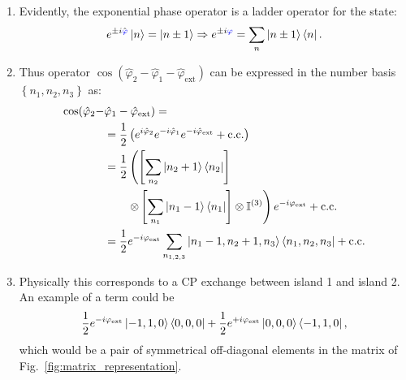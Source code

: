 \begin{enumerate}
\item Evidently, the exponential phase operator is a ladder operator for the  state:
  \begin{equation}
    \label{eq:ab5}
    e^{\pm i\hat{\textcolor{blue}{\varphi}}}\ket{n} = \ket{n \pm 1} \Rightarrow e^{\pm i\textcolor{blue}{\varphi}} = \sum_{{n}} \ket{n\pm1}\bra{n}.
  \end{equation}
 
\item Thus  operator $\cos(\hat{\varphi}_2-\hat{\varphi}_1-\hat{\varphi}_{\text{ext}})$ can be  expressed in the
  number basis $ \left\{n_{1},n_2,n_3\right\} $ as: {\scriptsize
    \begin{equation}
      \label{eq:ab4}
      \begin{aligned}
	\cos(\hat{\varphi}_2-& \hat{\varphi}_1-\hat{\varphi}_{\text{ext}}) =\\
        & = \frac{1}{2}\left(e^{i\hat{\varphi}_{2}}e^{-i\hat{\varphi}_1}e^{-i\hat{\varphi}_{\text{ext}}}+\text{c.c.}\right)\\
        & =  \frac{1}{2} \left(\left[\sum_{n_2}\ket{n_2+1}\bra{n_2}\right]\right. \\
        & \qquad \left.\otimes \left[\sum_{n_1}\ket{n_1-1}\bra{n_1}\right]
          \otimes\mathbb{I}^{(3)}\right)e^{-i\varphi_{\text{ext}}} + \text{c.c.}\\
        &             =              \frac{1}{2}e^{-i\varphi_{\text{ext}}}             \sum_{n_{1,2,3}}
        \ket{n_1-1,n_2+1,n_3}\bra{n_1,n_2,n_3} + \text{c.c.}
      \end{aligned}
    \end{equation}}
  
\item Physically this corresponds  to a CP exchange between island 1 and  island 2. An example
  of a term could be
  \begin{equation}
    \label{eq:ab6}
    \frac{1}{2}e^{-i\varphi_{\text{ext}}}\ket{-1,1,0}\bra{0,0,0} + \frac{1}{2}e^{+i\varphi_{\text{ext}}}\ket{0,0,0}\bra{-1,1,0},
  \end{equation}
  \noindent  which would  be a  pair of  symmetrical off-diagonal  elements in  the matrix  of
  Fig.~\ref{fig:matrix_representation}.
\end{enumerate}



